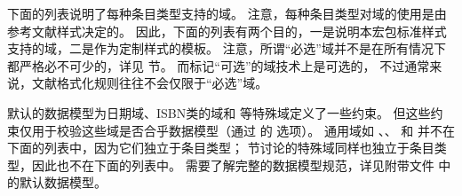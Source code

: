 下面的列表说明了每种条目类型支持的域。
注意，每种条目类型对域的使用是由参考文献样式决定的。
因此，下面的列表有两个目的，一是说明本宏包标准样式支持的域，二是作为定制样式的模板。
注意，所谓“必选”域并不是在所有情况下都严格必不可少的，详见  节。
而标记“可选”的域技术上是可选的，
不过通常来说，文献格式化规则往往不会仅限于“必选”域。

默认的数据模型为日期域、ISBN类的域和  等特殊域定义了一些约束。
但这些约束仅用于校验这些域是否合乎数据模型（通过 \biber 的  选项）。
通用域如 、、 和  并不在下面的列表中，因为它们独立于条目类型；
 节讨论的特殊域同样也独立于条目类型，因此也不在下面的列表中。
需要了解完整的数据模型规范，详见\biblatex 附带文件 中的默认数据模型。

